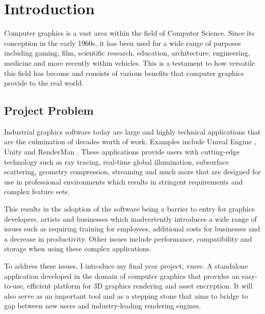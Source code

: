 \documentclass[11pt]{article}
\begin{document}
\clearpage
\printnoidxglossary[nonumberlist]

\clearpage
\printnoidxglossary[type=\acronymtype, nonumberlist]

\pagebreak
\pagestyle{fancy}

\section{Introduction}
Computer graphics is a vast area within the field of Computer Science. Since its
conception in the early 1960s, it has been used for a wide range of purposes
including gaming, film, scientific research, education, architecture,
engineering, medicine and more recently within vehicles. This is a testament to
how versatile this field has become and consists of various benefits that
computer graphics provide to the real world.

\subsection{Project Problem}
Industrial graphics software today are large and highly technical applications
that are the culmination of decades worth of work. Examples include Unreal Engine
\cite{unreal_engine}, Unity \cite{unity} and RenderMan \cite{render_man}. These
applications provide users with cutting-edge technology such as ray tracing,
real-time global illumination, subsurface scattering, geometry compression,
streaming and much more that are designed for use in professional environments
which results in stringent requirements and complex feature sets.

This results in the adoption of the software being a barrier to entry for
graphics developers, artists and businesses which inadvertently introduces a
wide range of issues such as requiring training for employees, additional costs
for businesses and a decrease in productivity. Other issues include performance,
compatibility and storage when using these complex applications.


To address these issues, I introduce my final year project, \gls*{vmve}. A
standalone application developed in the domain of computer graphics that
provides an easy-to-use, efficient platform for 3D graphics rendering and asset
encryption. It will also serve as an important tool and as a stepping stone that
aims to bridge to gap between new users and industry-leading rendering engines.
\end{document}
